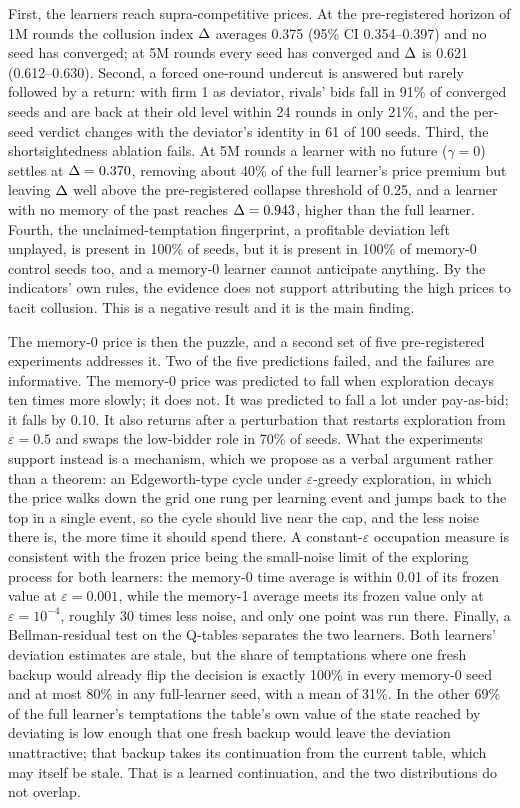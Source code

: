 First, the learners reach supra-competitive prices. At the pre-registered horizon of 1M rounds the collusion index $\Delta$ averages 0.375 (95\% CI 0.354--0.397) and no seed has converged; at 5M rounds every seed has converged and $\Delta$ is 0.621 (0.612--0.630). Second, a forced one-round undercut is answered but rarely followed by a return: with firm 1 as deviator, rivals' bids fall in 91\% of converged seeds and are back at their old level within 24 rounds in only 21\%, and the per-seed verdict changes with the deviator's identity in 61 of 100 seeds. Third, the shortsightedness ablation fails. At 5M rounds a learner with no future ($\gamma = 0$) settles at $\Delta = 0.370$, removing about 40\% of the full learner's price premium but leaving $\Delta$ well above the pre-registered collapse threshold of 0.25, and a learner with no memory of the past reaches $\Delta = 0.943$, higher than the full learner. Fourth, the unclaimed-temptation fingerprint, a profitable deviation left unplayed, is present in 100\% of seeds, but it is present in 100\% of memory-0 control seeds too, and a memory-0 learner cannot anticipate anything. By the indicators' own rules, the evidence does not support attributing the high prices to tacit collusion. This is a negative result and it is the main finding.

The memory-0 price is then the puzzle, and a second set of five pre-registered experiments addresses it. Two of the five predictions failed, and the failures are informative. The memory-0 price was predicted to fall when exploration decays ten times more slowly; it does not. It was predicted to fall a lot under pay-as-bid; it falls by 0.10. It also returns after a perturbation that restarts exploration from $\varepsilon = 0.5$ and swaps the low-bidder role in 70\% of seeds. 
What the experiments support instead is a mechanism, which we propose as a verbal argument rather than a theorem: an Edgeworth-type cycle under $\varepsilon$-greedy exploration, in which the price walks down the grid one rung per learning event and jumps back to the top in a single event, so the cycle should live near the cap, and the less noise there is, the more time it should spend there. A constant-$\varepsilon$ occupation measure is consistent with the frozen price being the small-noise limit of the exploring process for both learners: the memory-0 time average is within 0.01 of its frozen value at $\varepsilon = 0.001$, while the memory-1 average meets its frozen value only at $\varepsilon = 10^{-4}$, roughly 30 times less noise, and only one point was run there. Finally, a Bellman-residual test on the Q-tables separates the two learners. Both learners' deviation estimates are stale, but the share of temptations where one fresh backup would already flip the decision is exactly 100\% in every memory-0 seed and at most 80\% in any full-learner seed, with a mean of 31\%. In the other 69\% of the full learner's temptations the table's own value of the state reached by deviating is low enough that one fresh backup would leave the deviation unattractive; that backup takes its continuation from the current table, which may itself be stale. That is a learned continuation, and the two distributions do not overlap.

